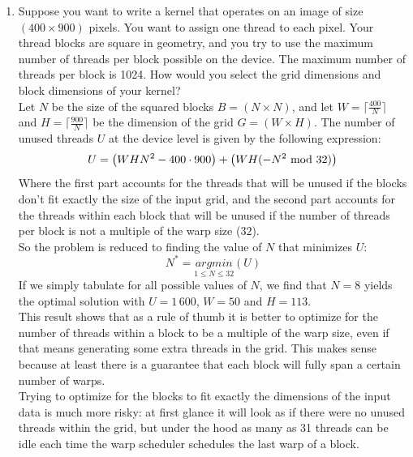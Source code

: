 \documentclass{article}
\begin{document}
\begin{enumerate}[1.]
	\item Suppose you want to write a kernel that operates on an image of size $(400 \times 900)$
    pixels. You want to assign one thread to each pixel. Your thread blocks are square
    in geometry, and you try to use the maximum number of threads per block possible on
    the device. The maximum number of threads per block is 1024. How would you
    select the grid dimensions and block dimensions of your kernel?\\
    Let $N$ be the size of the squared blocks $B = (N \times N)$, and let $W = \lceil\frac{400}{N}\rceil$ and $H = \lceil\frac{900}{N}\rceil$ be the dimension of the grid $G = (W \times H)$. The number of unused threads $U$ at the device level is given by the following expression:
    \begin{equation*}
        U = \left(WHN^2 - 400\cdot900\right) + \left(WH(-N^2 \text{ mod }32)\right) \\
    \end{equation*}
    Where the first part accounts for the threads that will be unused if the blocks don't fit exactly the size of the input grid, and the second part accounts for the threads within each block that will be unused if the number of threads per block is not a multiple of the warp size ($32$).\\
    So the problem is reduced to finding the value of $N$ that minimizes $U$:
    \begin{equation*}
        N^* = \underset{1 \leq N \leq 32}{argmin}(U)
    \end{equation*}
    If we simply tabulate for all possible values of $N$, we find that $N=8$ yields the optimal solution with $U=1\,600$, $W=50$ and $H=113$.\\
    This result shows that as a rule of thumb it is better to optimize for the number of threads within a block to be a multiple of the warp size, even if that means generating some extra threads in the grid. This makes sense because at least there is a guarantee that each block will fully span a certain number of warps.\\
    Trying to optimize for the blocks to fit exactly the dimensions of the input data is much more risky: at first glance it will look as if there were no unused threads within the grid, but under the hood as many as 31 threads can be idle each time the warp scheduler schedules the last warp of a block.

\end{enumerate}
\end{document}
